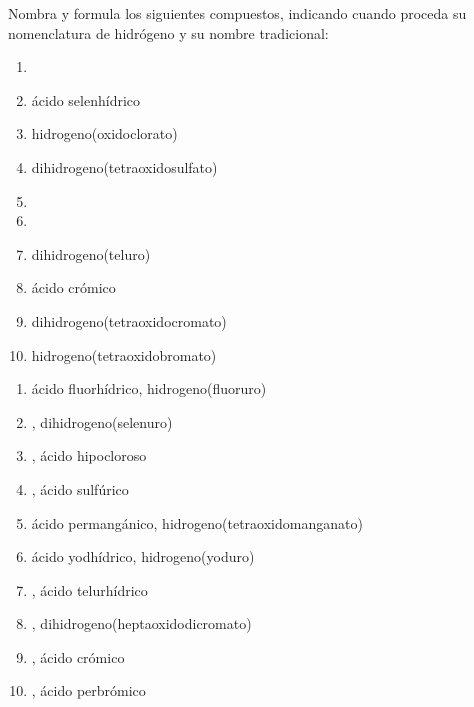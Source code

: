 \documentclass[10pt,a5paper,twoside]{article}
\begin{document}
\begin{exercise}[
    tags    = {inorgánica,ácidos,ácidos binarios,ácidos ternarios,oxoácidos},
    topics  = {química inorgánica,formulación,nomenclatura},
    source  = {SAN Formulación, p28, e34},
  ]
  Nombra y formula los siguientes compuestos, indicando cuando proceda su nomenclatura de hidrógeno y su nombre tradicional:

  \begin{enumerate}
    \item {}
    \item ácido selenhídrico
    \item hidrogeno(oxidoclorato)
    \item dihidrogeno(tetraoxidosulfato)
    \item {}
    \item {}
    \item dihidrogeno(teluro)
    \item ácido crómico
    \item dihidrogeno(tetraoxidocromato)
    \item hidrogeno(tetraoxidobromato)
  \end{enumerate}
\end{exercise}

\begin{solution}
  \begin{enumerate}
    \item ácido fluorhídrico, hidrogeno(fluoruro)
    \item {}, dihidrogeno(selenuro)
    \item {}, ácido hipocloroso
    \item {}, ácido sulfúrico
    \item ácido permangánico,  hidrogeno(tetraoxidomanganato)
    \item ácido yodhídrico, hidrogeno(yoduro)
    \item {}, ácido telurhídrico
    \item {}, dihidrogeno(heptaoxidodicromato)
    \item {}, ácido crómico
    \item {}, ácido perbrómico
  \end{enumerate}
\end{solution}
\end{document}
